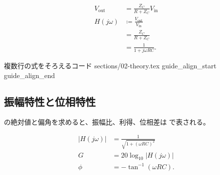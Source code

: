 \begin{align}
  V_{\mathrm{out}}
    &=\frac{Z_C}{R+Z_C}V_{\mathrm{in}}
      \label{eq:divider}\\
  H(j\omega)
    &\coloneqq\frac{V_{\mathrm{out}}}{V_{\mathrm{in}}}
      \label{eq:definition}\\
    &=\frac{Z_C}{R+Z_C}
      \label{eq:substitution}\\
    &=\frac{1}{1+j\omega RC}.
      \label{eq:transfer}
\end{align}

\SampleGuideSource
  {複数行の式をそろえるコード}
  {sections/02-theory.tex}
  {guide_align_start}
  {guide_align_end}




\subsection{振幅特性と位相特性}
\label{subsec:frequency-characteristics}

の絶対値と偏角を求めると、振幅比、利得、位相差は
で表される。

\begin{align}
  \lvert H(j\omega)\rvert
    &=\frac{1}{\sqrt{1+(\omega RC)^2}}
      \label{eq:magnitude}\\
  G
    &=20\log_{10}\lvert H(j\omega)\rvert
      \label{eq:gain}\\
  \phi
    &=-\tan^{-1}(\omega RC).
      \label{eq:phase}
\end{align}



